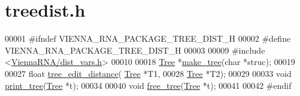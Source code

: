 \hypertarget{treedist_8h_source}{}\section{treedist.\+h}
\label{treedist_8h_source}

\begin{DoxyCode}
00001 \textcolor{preprocessor}{#ifndef VIENNA\_RNA\_PACKAGE\_TREE\_DIST\_H}
00002 \textcolor{preprocessor}{#define VIENNA\_RNA\_PACKAGE\_TREE\_DIST\_H}
00003 
00009 \textcolor{preprocessor}{#include <\hyperlink{dist__vars_8h}{ViennaRNA/dist\_vars.h}>}
00010 
00018 \hyperlink{structTree}{Tree}   *\hyperlink{treedist_8h_a08fe4d5afd385dce593b86eaf010c6e3}{make\_tree}(\textcolor{keywordtype}{char} *struc);
00019 
00027 \textcolor{keywordtype}{float}   \hyperlink{treedist_8h_a3b21f1925f7071f46d93431a835217bb}{tree\_edit\_distance}( \hyperlink{structTree}{Tree} *T1,
00028                             \hyperlink{structTree}{Tree} *T2);
00029 
00033 \textcolor{keywordtype}{void}    \hyperlink{treedist_8h_a21ad4de3ba4055aeef08b28c9ad48894}{print\_tree}(\hyperlink{structTree}{Tree} *t);
00034 
00040 \textcolor{keywordtype}{void}    \hyperlink{treedist_8h_acbc1cb9bce582ea945e4a467c76a57aa}{free\_tree}(\hyperlink{structTree}{Tree} *t);
00041 
00042 \textcolor{preprocessor}{#endif}
\end{DoxyCode}
